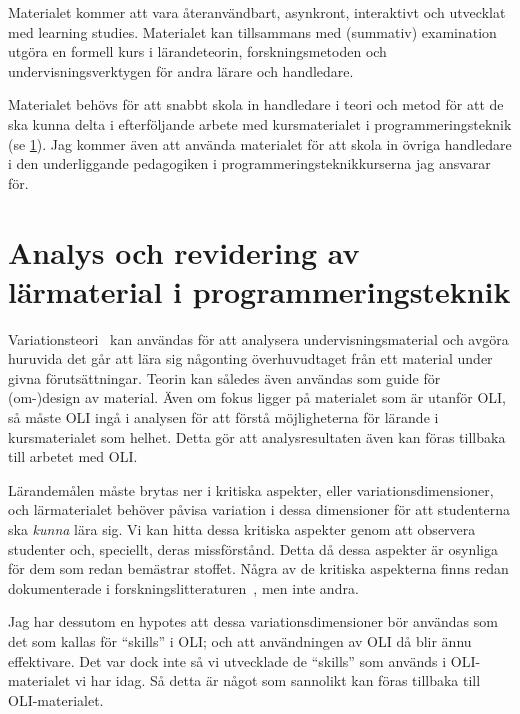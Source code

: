\documentclass[a4paper,swedish]{article}
\begin{document}
Materialet kommer att vara återanvändbart, asynkront, interaktivt och utvecklat 
med learning studies. Materialet kan tillsammans med (summativ) examination 
utgöra en formell kurs i lärandeteorin, forskningsmetoden och 
undervisningsverktygen för andra lärare och handledare.

Materialet behövs för att snabbt skola in handledare i teori och metod för att 
de ska kunna delta i efterföljande arbete med kursmaterialet i 
programmeringsteknik (se \cref{analys}). Jag kommer även att använda materialet 
för att skola in övriga handledare i den underliggande pedagogiken i 
programmeringsteknikkurserna jag ansvarar för.


\section{Analys och revidering av lärmaterial i programmeringsteknik}%
\label{analys}

Variationsteori~\parencite[kap.~3]{NecessaryConditionsOfLearning} kan användas 
för att analysera undervisningsmaterial och avgöra huruvida det går att lära 
sig någonting överhuvudtaget från ett material under givna förutsättningar. 
Teorin kan således även användas som guide för (om-)design av material.
Även om fokus ligger på materialet som är utanför OLI, så måste OLI ingå i 
analysen för att förstå möjligheterna för lärande i kursmaterialet som helhet. 
Detta gör att analysresultaten även kan föras tillbaka till arbetet med OLI.

Lärandemålen måste brytas ner i kritiska aspekter, eller variationsdimensioner, 
och lärmaterialet behöver påvisa variation i dessa dimensioner för att 
studenterna ska \emph{kunna} lära sig.
Vi kan hitta dessa kritiska aspekter genom att observera studenter och, 
speciellt, deras missförstånd.
Detta då dessa aspekter är osynliga för dem som redan bemästrar stoffet.
Några av de kritiska aspekterna finns redan dokumenterade i 
forskningslitteraturen~\parencite[exempelvis][]{VariationTheoryInProgramming}, 
men inte andra.

Jag har dessutom en hypotes att dessa variationsdimensioner bör användas som 
det som kallas för \enquote{skills} i OLI; och att användningen av OLI då blir 
ännu effektivare.
Det var dock inte så vi utvecklade de \enquote{skills} som används i 
OLI-materialet vi har idag.
Så detta är något som sannolikt kan föras tillbaka till OLI-materialet.
\end{document}
